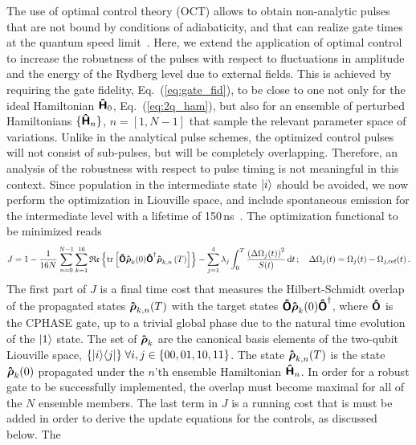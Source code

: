 The use of optimal control theory (OCT) allows to obtain non-analytic pulses
that are not bound by conditions of adiabaticity, and that can realize gate
times at the quantum speed
limit~\cite{GoerzJPB11,MuellerKochPRA11,MuellerKochSpIssue11}.
Here, we extend the application of optimal control to increase the
robustness of the pulses with respect to fluctuations in amplitude and the
energy of the Rydberg level due to external fields. This is achieved by
requiring the gate fidelity, Eq.~(\ref{eq:gate_fid}), to be close
to one not only for the ideal
Hamiltonian $\Op{H}_0$, Eq.~(\ref{eq:2q_ham}), but also for an ensemble
of perturbed Hamiltonians $\{\Op{H}_n\}$, $n=[1,N-1]$ that sample the relevant
parameter space of variations.
Unlike in the analytical pulse schemes, the optimized control pulses will not
consist of sub-pulses, but will be completely overlapping. Therefore, an
analysis of the robustness with respect to pulse timing is not meaningful in
this context.
Since population in the intermediate state
$\Ket{i}$ should be avoided, we now perform the optimization in Liouville space, and
include spontaneous emission for the intermediate level with a lifetime of
150$\,$ns~\cite{CampaniLANC1978,OrtizJQSRT1981}. The optimization functional to be
minimized reads
\begin{equation}
  J = 1 - \frac{1}{16 N} \sum_{n=0}^{N-1} \sum_{k=1}^{16}
    \mathfrak{Re}\left\{\trace\left[
      \Op O\Op\rho_{k}(0)\Op O^{\dagger}\Op\rho_{k,n}\left(T\right)
    \right]\right\}
    - \sum_{j=1}^{4} \lambda_j \int_0^T
      \frac{\left(\Delta \Omega_{j}(t)\right)^2}{S(t)}
       \dd t\,; \quad
       \Delta \Omega_{j}(t) = \Omega_{j}(t)-\Omega_{j, \text{ref}}(t)\,.
  \label{eq:functional}
\end{equation}
The first part of $J$ is a final time cost that measures the Hilbert-Schmidt
overlap of the propagated states $\Op{\rho}_{k,n}(T)$ with the target states
$\Op{O}\Op{\rho}_k(0)\Op{O}^\dagger$, where $\Op{O}$ is the CPHASE gate, up to
a trivial global phase due to the natural time evolution of the $\Ket{1}$ state.
The set of $\Op{\rho}_k$ are the canonical basis elements of the two-qubit
Liouville space, $\{\Ket{i}\!\Bra{j} \} \; \forall i,j \in \{ 00, 01, 10, 11\}$.
The state $\Op{\rho}_{k,n}(T)$ is the state $\Op{\rho}_{k}(0)$ propagated under
the $n$'th ensemble Hamiltonian $\Op{H}_n$. In order for a robust gate to be
successfully implemented, the overlap must become maximal for all of the $N$
ensemble members.
The last term in $J$ is a running cost that is must be added in order to
derive the update equations for the controls, as discussed below. The
